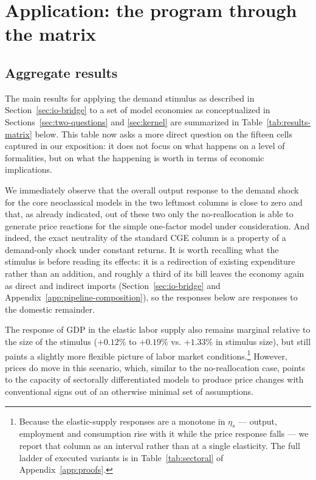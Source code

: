 \section{Application: the program through the matrix}\label{sec:application}

\subsection{Aggregate results}\label{subsec:aggregate}

The main results for applying the demand stimulus as described in Section~\ref{sec:io-bridge} to a set of model economies as conceptualized in Sections~\ref{sec:two-questions} and \ref{sec:kernel} are summarized in Table~\ref{tab:results-matrix} below. This table now asks a more direct question on the fifteen cells captured in our exposition: it does not focus on what happens on a level of formalities, but on what the happening is worth in terms of economic implications.



We immediately observe that the overall output response to the demand shock for the core neoclassical models in the two leftmost columns is close to zero and that, as already indicated, out of these two only the no-reallocation is able to generate price reactions for the simple one-factor model under consideration. And indeed, the exact neutrality of the standard CGE column is a property of a demand-only shock under constant returns. It is worth recalling what the stimulus is before reading its effects: it is a
redirection of existing expenditure rather than an addition, and roughly a third of its
bill leaves the economy again as direct and indirect imports
(Section~\ref{sec:io-bridge} and Appendix~\ref{app:pipeline-composition}), so the
responses below are responses to the domestic remainder.

The response of GDP in the elastic labor supply also remains marginal relative to the size of the stimulus ($+0.12\%$ to $+0.19\%$ vs. $+1.33\%$ in stimulus size), but still paints a slightly more flexible picture of labor market conditions.\footnote{Because the elastic-supply responses are a monotone in $\eta_s$ --- output, employment and consumption rise with it while the price response falls --- we report that column as an interval rather than at a single elasticity. The full ladder of executed variants is in Table~\ref{tab:sectoral} of
Appendix~\ref{app:proofs}.} However, prices do move in this scenario, which, similar to the no-reallocation case, points to the capacity of sectorally differentiated models to produce price changes with conventional signs out of an otherwise minimal set of assumptions. 


